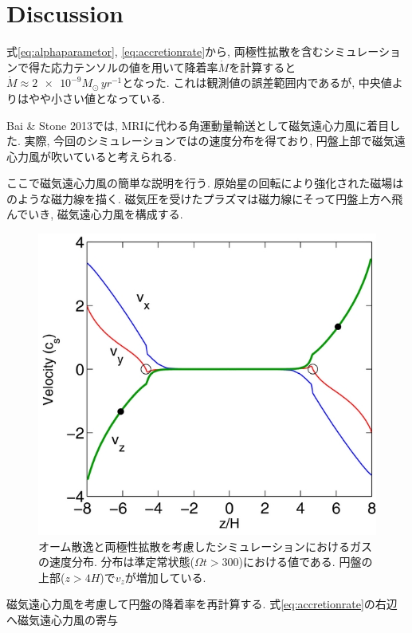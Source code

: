 \documentclass[a4paper,10pt,oneside,twocolumn,notitlepage,final,dvipdfmx]{jarticle}
\begin{document}
\section{Discussion}
式\eqref{eq:alphaparametor}, \eqref{eq:accretionrate}から, 両極性拡散を含むシミュレーションで得た応力テンソルの値を用いて降着率$\dot{M}$を計算すると\( \dot{M} \approx \num{2e-9} M_{\odot}\, \si{yr^{-1}} \)となった. これは観測値の誤差範囲内であるが, 中央値よりはやや小さい値となっている. 
\par
Bai \& Stone 2013では, MRIに代わる角運動量輸送として磁気遠心力風に着目した. 実際, 今回のシミュレーションではの速度分布を得ており, 円盤上部で磁気遠心力風が吹いていると考えられる. 
\par
ここで磁気遠心力風の簡単な説明を行う. 原始星の回転により強化された磁場はのような磁力線を描く. 磁気圧を受けたプラズマは磁力線にそって円盤上方へ飛んでいき, 磁気遠心力風を構成する. 
\par
\begin{figure}\label{fig:v_distribution}
  \centering
  \includegraphics[width=1\linewidth]{./contents/v_distribution.png}
  \caption{オーム散逸と両極性拡散を考慮したシミュレーションにおけるガスの速度分布. 分布は準定常状態(\(\Omega t > 300\))における値である. 円盤の上部(\( z>4H \))で$v_z$が増加している.}
\end{figure}
\par
磁気遠心力風を考慮して円盤の降着率を再計算する. 式\eqref{eq:accretionrate}の右辺へ磁気遠心力風の寄与
\end{document}
